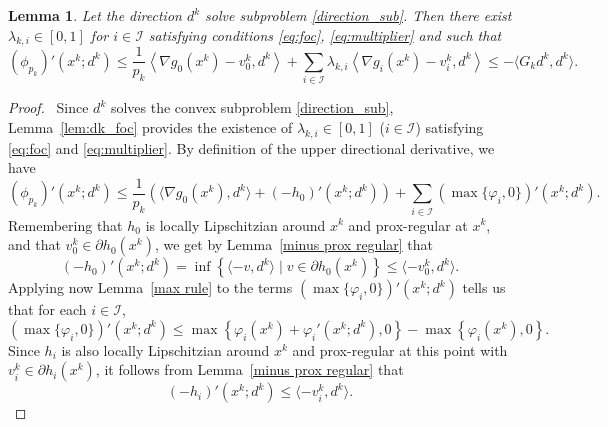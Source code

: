 \documentclass[11pt,a4paper]{article}
\newtheorem{lemma}[theorem]{Lemma}
\theoremstyle{plain}
\begin{document}
\begin{lemma}\label{lemma:descent_direction}
Let the direction $d^k$ solve subproblem \eqref{direction_sub}. Then there exist {$\lambda_{k,i} \in [0,1]$ for $i\in\mathcal{I}$} satisfying  conditions \eqref{eq:foc}, \eqref{eq:multiplier} and such that
\begin{equation}\label{eq:descent_direction}
(\phi_{p_k})'(x^k; d^k) \le 
\frac{1}{p_k} \left\langle \nabla g_0(x^k) - v_0^k, d^k \right\rangle 
+ \sum_{i\in\mathcal I} \lambda_{k,i} \left\langle\nabla g_i(x^k)-v_i^k, d^k\right\rangle \le -\langle G_kd^k,d^k \rangle.
\end{equation}
\end{lemma}


\begin{proof}\,
Since $d^k$ solves the convex subproblem \eqref{direction_sub}, Lemma~\ref{lem:dk_foc} provides the existence of $\lambda_{k,i} \in [0,1]$ ($i \in \mathcal{I}$) satisfying \eqref{eq:foc} and \eqref{eq:multiplier}. 
By definition of the upper directional derivative, we have
\begin{equation}\label{prop1_eq1}
  (\phi_{p_k})'(x^k; d^k) 
  \leq \frac{1}{p_k} \left( \langle \nabla g_0(x^k), d^k \rangle + (-h_0)'(x^k; d^k)\right)
  + \sum_{i\in\mathcal I} \left(\max\{\varphi_i, 0\}\right)'(x^k; d^k).
\end{equation}
Remembering that $h_0$ is locally Lipschitzian around $x^k$ and prox-regular at $x^k$, and that $v_0^k \in \partial h_0(x^k)$, we get by Lemma~\ref{minus prox regular} that
\begin{equation}\label{prop1_eq2}
 (-h_0)'(x^k; d^k) = \inf\left\{ \langle -v, d^k \rangle \mid v \in \partial h_0(x^k) \right\} \leq \langle -v_0^k, d^k \rangle.
\end{equation}
Applying now Lemma~\ref{max rule} to the terms $\left(\max\{\varphi_i, 0\}\right)'(x^k; d^k)$ tells us that for each $i \in \mathcal I$,
\begin{equation}\label{prop1_eq3}
 \left(\max\{{\varphi_i}, 0\}\right)'\left(x ^k; d^k\right) \le \max\left\{ {\varphi_i}(x^k) +{\varphi_i}'(x^k; d^k), 0 \right\} - \max\left\{ {\varphi_i}(x^k), 0 \right\}.
\end{equation}
Since $h_i$ is also locally Lipschitzian around $x^k$ and prox-regular at this point with $v_i^k \in \partial h_i(x^k)$, it follows from Lemma~\ref{minus prox regular} that
\begin{equation*}
 (-h_i)'(x^k; d^k)  \leq \langle -v_i^k, d^k \rangle.
\end{equation*}

\end{proof}
\end{document}

